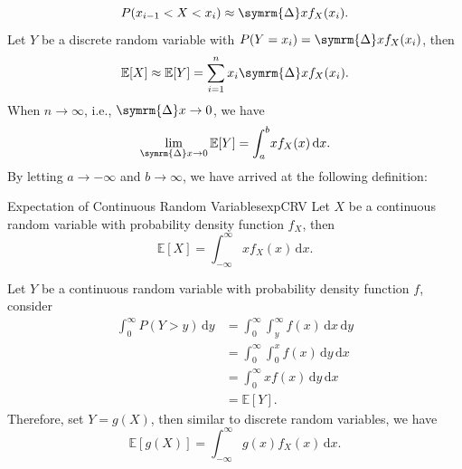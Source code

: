 \documentclass[math]{amznotes}
\theoremstyle{remark}
\newcommand{\0}{\mathbf{0}}
\newcommand{\1}{\mathbf{1}}
\begin{document}
\begin{equation*}
    P(x_{i - 1} < X < x_i) \approx \symrm{\Delta}xf_X(x_i).
\end{equation*}
Let $Y$ be a discrete random variable with $P(Y = x_i) = \symrm{\Delta}xf_X(x_i)$, then 
\begin{equation*}
    \mathbb{E}[X] \approx \mathbb{E}[Y] = \sum_{i = 1}^{n}x_i\symrm{\Delta}xf_X(x_i).
\end{equation*}
When $n \to \infty$, i.e., $\symrm{\Delta}x \to 0$, we have
\begin{equation*}
    \lim_{\symrm{\Delta}x \to 0}\mathbb{E}[Y] = \int_{a}^{b}\!xf_X(x)\,\mathrm{d}x.
\end{equation*}
By letting $a \to -\infty$ and $b \to \infty$, we have arrived at the following definition:
\begin{dfnbox}{Expectation of Continuous Random Variables}{expCRV}
    Let $X$ be a continuous random variable with probability density function $f_X$, then
    \begin{equation*}
        \mathbb{E}[X] = \int_{-\infty}^{\infty}\!xf_X(x)\,\mathrm{d}x.
    \end{equation*}
\end{dfnbox}
Let $Y$ be a continuous random variable with probability density function $f$, consider
\begin{align*}
    \int_{0}^{\infty}\!P(Y > y)\,\mathrm{d}y & = \int_{0}^{\infty}\!\int_{y}^{\infty}\!f(x)\,\mathrm{d}x\,\mathrm{d}y \\
    & = \int_{0}^{\infty}\!\int_{0}^{x}\!f(x)\,\mathrm{d}y\,\mathrm{d}x \\ 
    & = \int_{0}^{\infty}\!xf(x)\,\mathrm{d}y\,\mathrm{d}x \\ 
    & = \mathbb{E}[Y].
\end{align*}
Therefore, set $Y = g(X)$, then similar to discrete random variables, we have
\begin{equation*}
    \mathbb{E}\left[g(X)\right] = \int_{-\infty}^{\infty}\!g(x)f_X(x)\,\mathrm{d}x.
\end{equation*}
\end{document}
